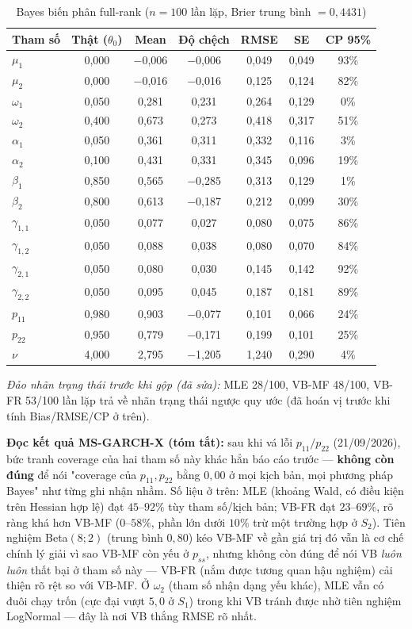 \documentclass[11pt,a4paper]{article}
\begin{document}
\begin{table}[H]\centering\footnotesize
\caption{Bayes biến phân full-rank ($n=100$ lần lặp, Brier trung bình $=0,4431$)}
\begin{tabularx}{\textwidth}{l C C C C C C}
\toprule
\textbf{Tham số} & \textbf{Thật ($\theta_0$)} & \textbf{Mean} & \textbf{Độ chệch} & \textbf{RMSE} & \textbf{SE} & \textbf{CP 95\%} \\
\midrule
$\mu_1$ & 0,000 & $-$0,006 & $-$0,006 & 0,049 & 0,049 & 93\% \\
$\mu_2$ & 0,000 & $-$0,016 & $-$0,016 & 0,125 & 0,124 & 82\% \\
$\omega_1$ & 0,050 & 0,281 & 0,231 & 0,264 & 0,129 & 0\% \\
$\omega_2$ & 0,400 & 0,673 & 0,273 & 0,418 & 0,317 & 51\% \\
$\alpha_1$ & 0,050 & 0,361 & 0,311 & 0,332 & 0,116 & 3\% \\
$\alpha_2$ & 0,100 & 0,431 & 0,331 & 0,345 & 0,096 & 19\% \\
$\beta_1$ & 0,850 & 0,565 & $-$0,285 & 0,313 & 0,129 & 1\% \\
$\beta_2$ & 0,800 & 0,613 & $-$0,187 & 0,212 & 0,099 & 30\% \\
$\gamma_{1,1}$ & 0,050 & 0,077 & 0,027 & 0,080 & 0,075 & 86\% \\
$\gamma_{1,2}$ & 0,050 & 0,088 & 0,038 & 0,080 & 0,070 & 84\% \\
$\gamma_{2,1}$ & 0,050 & 0,080 & 0,030 & 0,145 & 0,142 & 92\% \\
$\gamma_{2,2}$ & 0,050 & 0,095 & 0,045 & 0,187 & 0,181 & 89\% \\
$p_{11}$ & 0,980 & 0,903 & $-$0,077 & 0,101 & 0,066 & 24\% \\
$p_{22}$ & 0,950 & 0,779 & $-$0,171 & 0,199 & 0,101 & 25\% \\
$\nu$ & 4,000 & 2,795 & $-$1,205 & 1,240 & 0,290 & 4\% \\
\bottomrule
\end{tabularx}
\end{table}

\emph{Đảo nhãn trạng thái trước khi gộp (đã sửa):} MLE 28/100, VB-MF 48/100, VB-FR 53/100 lần lặp trả về nhãn trạng thái ngược quy ước (đã hoán vị trước khi tính Bias/RMSE/CP ở trên).
\bigskip

\textbf{Đọc kết quả MS-GARCH-X (tóm tắt):} sau khi vá lỗi $p_{11}/p_{22}$ (21/09/2026),
bức tranh coverage của hai tham số này khác hẳn báo cáo trước --- \textbf{không
còn đúng} để nói "coverage của $p_{11},p_{22}$ bằng $0{,}00$ ở mọi kịch bản,
mọi phương pháp Bayes" như từng ghi nhận nhầm. Số liệu ở trên: MLE (khoảng
Wald, có điều kiện trên Hessian hợp lệ) đạt $45$--$92\%$ tùy tham số/kịch bản;
VB-FR đạt $23$--$69\%$, rõ ràng khá hơn VB-MF ($0$--$58\%$, phần lớn dưới
$10\%$ trừ một trường hợp ở $S_2$). Tiên nghiệm Beta$(8;2)$ (trung bình
$0{,}80$) kéo VB-MF về gần giá trị đó vẫn là cơ chế chính lý giải vì sao
VB-MF còn yếu ở $p_{ss}$, nhưng không còn đúng để nói VB \emph{luôn luôn}
thất bại ở tham số này --- VB-FR (nắm được tương quan hậu nghiệm) cải thiện
rõ rệt so với VB-MF. Ở $\omega_2$ (tham số nhận dạng yếu khác), MLE vẫn có
đuôi chạy trốn (cực đại vượt $5{,}0$ ở $S_1$) trong khi VB tránh được nhờ
tiên nghiệm LogNormal --- đây là nơi VB thắng RMSE rõ nhất.
\end{document}
